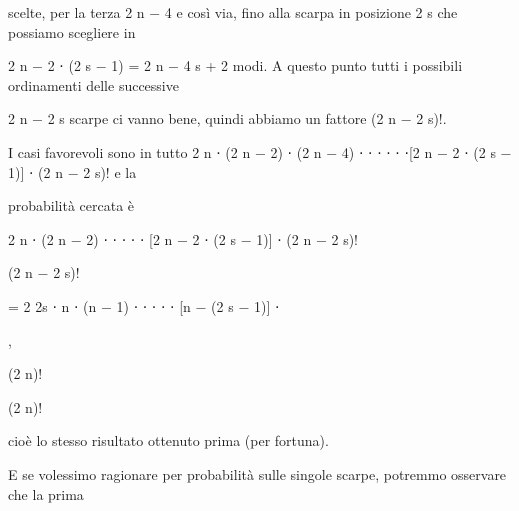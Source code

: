 \documentclass[a4paper,portrait,12pt]{article}
\begin{document}
\begin{flushleft}
scelte, per la terza 2 n $-$ 4 e così via, fino alla scarpa in posizione 2 s che possiamo scegliere in
\end{flushleft}


\begin{flushleft}
2 n $-$ 2 ⋅ (2 s $-$ 1) = 2 n $-$ 4 s + 2 modi. A questo punto tutti i possibili ordinamenti delle successive
\end{flushleft}


\begin{flushleft}
2 n $-$ 2 s scarpe ci vanno bene, quindi abbiamo un fattore (2 n $-$ 2 s)!.
\end{flushleft}


\begin{flushleft}
I casi favorevoli sono in tutto 2 n ⋅ (2 n $-$ 2) ⋅ (2 n $-$ 4) ⋅ ⋅ ⋅ ⋅ ⋅ ⋅[2 n $-$ 2 ⋅ (2 s $-$ 1)] ⋅ (2 n $-$ 2 s)! e la
\end{flushleft}


\begin{flushleft}
probabilit\`{a} cercata \`{e}
\end{flushleft}


\begin{flushleft}
2 n ⋅ (2 n $-$ 2) ⋅ ⋅ ⋅ ⋅ ⋅ [2 n $-$ 2 ⋅ (2 s $-$ 1)] ⋅ (2 n $-$ 2 s)!
\end{flushleft}


\begin{flushleft}
(2 n $-$ 2 s)!
\end{flushleft}


\begin{flushleft}
= 2 2s ⋅ n ⋅ (n $-$ 1) ⋅ ⋅ ⋅ ⋅ ⋅ [n $-$ (2 s $-$ 1)] ⋅
\end{flushleft}


,


\begin{flushleft}
(2 n)!
\end{flushleft}


\begin{flushleft}
(2 n)!
\end{flushleft}


\begin{flushleft}
cio\`{e} lo stesso risultato ottenuto prima (per fortuna).
\end{flushleft}


\begin{flushleft}
E se volessimo ragionare per probabilit\`{a} sulle singole scarpe, potremmo osservare che la prima
\end{flushleft}
\end{document}
